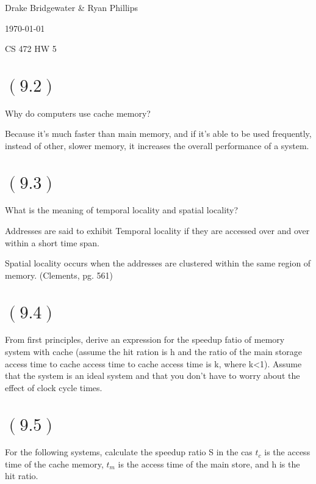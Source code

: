 \documentclass[letterpaper,12pt,titlepage]{article}
\def\name{Drake Bridgewater \& Ryan Phillips}
\begin{document}
\hfill \name

\hfill \today

\hfill CS 472 HW 5

\section*{$(9.2)$} Why do computers use cache memory?

\begin{mdframed}[style=MyFrame]
Because it's much faster than main memory, and if it's able to be used frequently, instead of other, slower memory, it increases the overall performance of a system.
\end{mdframed}

\section*{$(9.3)$} What is the meaning of temporal locality and spatial locality?

\begin{mdframed}[style=MyFrame]
Addresses are said to exhibit Temporal locality if they are accessed over and over within a short time span.

Spatial locality occurs when the addresses are clustered within the same region of memory. (Clements, pg. 561)
\end{mdframed}

\section*{$(9.4)$} From first principles, derive an expression for the speedup fatio of memory system with cache (assume the hit ration is h and the ratio of the main storage access time to cache access time to cache access time is k, where k<1). Assume that the system is an ideal system and that you don't have to worry about the effect of clock cycle times.

\begin{mdframed}[style=MyFrame]
\end{mdframed}

\section*{$(9.5)$} For the following systems, calculate the speedup ratio S in the cas $t_c$ is the access time of the cache memory, $t_m$ is the access time of the main store, and h is the hit ratio.
\end{document}
